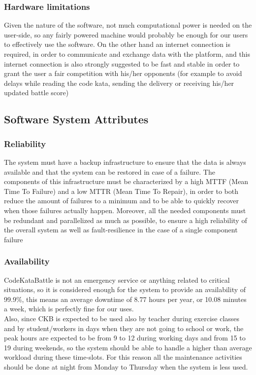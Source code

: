 \documentclass[../RASD.tex]{subfiles}
\begin{document}
        \subsubsection{Hardware limitations}
            Given the nature of the software, not much computational power is needed on the user-side, so any fairly powered machine would probably be enough for our users to effectively use the software. On the other hand an internet connection is required, in order to communicate and exchange data with the platform, and this internet connection is also strongly suggested to be fast and stable in order to grant the user a fair competition with his/her opponents (for example to avoid delays while reading the code kata, sending the delivery or receiving his/her updated battle score)

    \subsection{Software System Attributes}
        \subsubsection{Reliability}
            The system must have a backup infrastructure to ensure that the data is always available and that the system can be restored in case of a failure. The components of this infrastructure must be characterized by a high MTTF (Mean Time To Failure) and a low MTTR (Mean Time To Repair), in order to both reduce the amount of failures to a minimum and to be able to quickly recover when those failures actually happen. Moreover, all the needed components must be redundant and parallelized as much as possible, to ensure a high reliability of the overall system as well as fault-resilience in the case of a single component failure\newpage
        
        \subsubsection{Availability}
            CodeKataBattle is not an emergency service or anything related to critical situations, so it is considered enough for the system to provide an availability of 99.9\%, this means an average downtime of 8.77 hours per year, or 10.08 minutes a week, which is perfectly fine for our uses.\\
            Also, since CKB is expected to be used also by teacher during exercise classes and by student/workers in days when they are not going to school or work, the peak hours are expected to be from 9 to 12 during working days and from 15 to 19 during weekends, so the system should be able to handle a higher than average workload during these time-slots. For this reason all the maintenance activities should be done at night from Monday to Thursday when the system is less used.    
\end{document}
